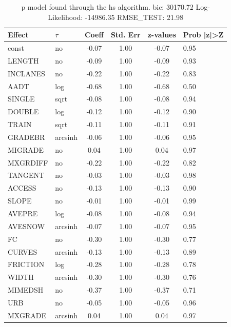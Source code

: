 \begin{table}
	\caption{p model found through the hs algorithm. bic: 30170.72 Log-Likelihood: -14986.35 RMSE_TEST: 21.98}
	\begin{center}
		\begin{tabular}{|l|l|c|c|c|l|}
			\hline
			Effect & $\tau$ & Coeff & Std. Err & z-values & Prob |z|>Z \\
			\hline
			const & no & -0.07 & 1.00 & -0.07 & 0.95 \\
			\hline
			LENGTH & no & -0.09 & 1.00 & -0.09 & 0.93 \\
			\hline
			INCLANES & no & -0.22 & 1.00 & -0.22 & 0.83 \\
			\hline
			AADT & log & -0.68 & 1.00 & -0.68 & 0.50 \\
			\hline
			SINGLE & sqrt & -0.08 & 1.00 & -0.08 & 0.94 \\
			\hline
			DOUBLE & log & -0.12 & 1.00 & -0.12 & 0.90 \\
			\hline
			TRAIN & sqrt & -0.11 & 1.00 & -0.11 & 0.91 \\
			\hline
			GRADEBR & arcsinh & -0.06 & 1.00 & -0.06 & 0.95 \\
			\hline
			MIGRADE & no & 0.04 & 1.00 & 0.04 & 0.97 \\
			\hline
			MXGRDIFF & no & -0.22 & 1.00 & -0.22 & 0.82 \\
			\hline
			TANGENT & no & -0.03 & 1.00 & -0.03 & 0.98 \\
			\hline
			ACCESS & no & -0.13 & 1.00 & -0.13 & 0.90 \\
			\hline
			SLOPE & no & -0.01 & 1.00 & -0.01 & 0.99 \\
			\hline
			AVEPRE & log & -0.08 & 1.00 & -0.08 & 0.94 \\
			\hline
			AVESNOW & arcsinh & -0.07 & 1.00 & -0.07 & 0.95 \\
			\hline
			FC & no & -0.30 & 1.00 & -0.30 & 0.77 \\
			\hline
			CURVES & arcsinh & -0.13 & 1.00 & -0.13 & 0.89 \\
			\hline
			FRICTION & log & -0.28 & 1.00 & -0.28 & 0.78 \\
			\hline
			WIDTH & arcsinh & -0.30 & 1.00 & -0.30 & 0.76 \\
			\hline
			MIMEDSH & no & -0.37 & 1.00 & -0.37 & 0.71 \\
			\hline
			URB & no & -0.05 & 1.00 & -0.05 & 0.96 \\
			\hline
			MXGRADE & arcsinh & 0.04 & 1.00 & 0.04 & 0.97 \\
			\hline

\end{tabular}
\end{center}
\end{table}
